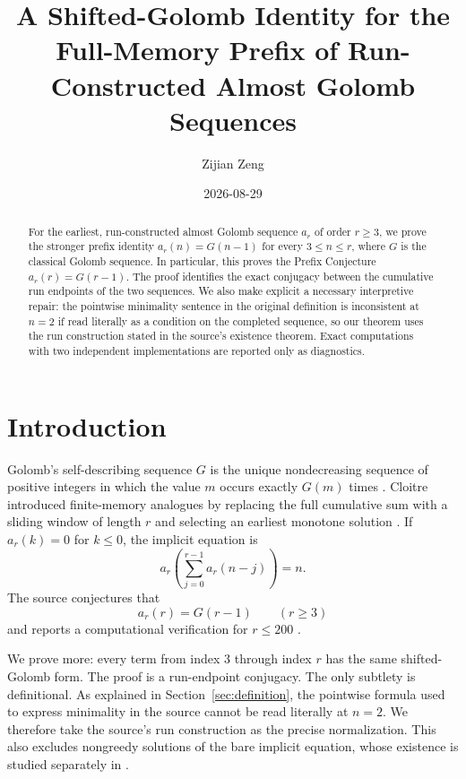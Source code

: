 \documentclass[11pt]{amsart}
\title[Shifted-Golomb Prefix Identity]{A Shifted-Golomb Identity for the Full-Memory Prefix of Run-Constructed Almost Golomb Sequences}
\author{Zijian Zeng}
\date{2026-08-29}
\theoremstyle{definition}
\begin{document}
\begin{abstract}
For the earliest, run-constructed almost Golomb sequence $a_r$ of order
$r\geq3$, we prove the stronger prefix identity
$a_r(n)=G(n-1)$ for every $3\leq n\leq r$, where $G$ is the classical
Golomb sequence.  In particular, this proves the Prefix Conjecture
$a_r(r)=G(r-1)$.  The proof identifies the exact conjugacy between the
cumulative run endpoints of the two sequences.  We also make explicit a
necessary interpretive repair: the pointwise minimality sentence in the
original definition is inconsistent at $n=2$ if read literally as a
condition on the completed sequence, so our theorem uses the run
construction stated in the source's existence theorem.  Exact computations
with two independent implementations are reported only as diagnostics.
\end{abstract}

\maketitle

\section{Introduction}

Golomb's self-describing sequence $G$ is the unique nondecreasing sequence
of positive integers in which the value $m$ occurs exactly $G(m)$ times
\cite{Golomb1966}.  Cloitre introduced finite-memory analogues by replacing
the full cumulative sum with a sliding window of length $r$ and selecting an
earliest monotone solution \cite{Cloitre2026Almost}.  If $a_r(k)=0$ for
$k\leq0$, the implicit equation is
\begin{equation}\label{eq:implicit}
 a_r\!\left(\sum_{j=0}^{r-1}a_r(n-j)\right)=n.
\end{equation}
The source conjectures that
\begin{equation}\label{eq:source-conjecture}
 a_r(r)=G(r-1)\qquad(r\geq3)
\end{equation}
and reports a computational verification for $r\leq200$
\cite[Conjecture~9.3]{Cloitre2026Almost}.

We prove more: every term from index $3$ through index $r$ has the same
shifted-Golomb form.  The proof is a run-endpoint conjugacy.  The only
subtlety is definitional.  As explained in Section~\ref{sec:definition}, the
pointwise formula used to express minimality in the source cannot be read
literally at $n=2$.  We therefore take the source's run construction
\cite[Theorem~2.2]{Cloitre2026Almost} as the precise normalization.  This
also excludes nongreedy solutions of the bare implicit equation, whose
existence is studied separately in \cite{Cloitre2026Beatty}.
\end{document}
